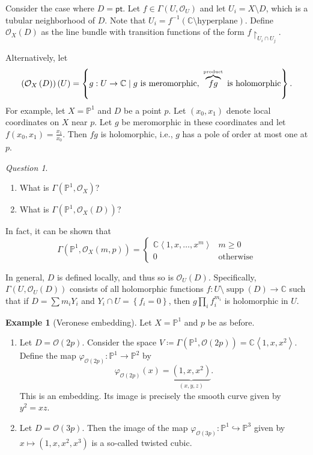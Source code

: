 \documentclass[10pt,letterpaper,cm]{nupset}
\theoremstyle{definition}
\newtheorem{exmp}[defn]{Example}
\theoremstyle{theorem}
\theoremstyle{remark}
\newtheorem*{question}{Question}
\newcommand{\C}{\mathbb C}
\renewcommand{\O}{\mathcal O}
\renewcommand{\P}{\mathbb P}
\newcommand{\1}{\mathbb{1}}
\newcommand{\0}{\vec 0}
\newcommand{\pt}{\mathsf{pt}}
\DeclareMathOperator{\supp}{supp}
\newcommand{\be}{\begin{enumerate}}
\newcommand{\ee}{\end{enumerate}}
\begin{document}
\medskip

Consider the case where $D = \pt$. Let $f \in \Gamma\left(U, \O_U\right)$ and let $U_i = X \setminus D$, which is a tubular neighborhood of $D$. Note that $U_i = f^{-1}\left (\C\setminus\text{hyperplane}\right)$. Define $\O_X(D)$ as the line bundle with transition functions of the form $f \restriction_{U_i \cap U_j}$.

\medskip

Alternatively, let $$\left(\O_X\left(D\right)\right)\left(U\right) = \left\{g : U \to \C  \mid g \text{ is meromorphic}, \ \overbrace{fg}^{\text{\tiny product}} \text{ is holomorphic}\right\}.$$
For example,
let $X = \P^1$ and $D$ be a point $p$. Let $\left(x_0, x_1\right)$ denote local coordinates on $X$ near $p$. Let $g$ be meromorphic in these coordinates and let $f\left(x_0, x_1\right) = \frac{x_1}{x_0}$. Then $f{g}$ is holomorphic, i.e., $g$ has a pole of order at most one at $p$. 
\begin{question} $ $
\be
\item What is $\Gamma\left(\P^1, \O_X\right)$?
\item What is $\Gamma\left(\P^1, \O_X\left(D\right)\right)$?
\ee
\end{question}

In fact, it can be shown that
\[
\Gamma\left(\P^1, \O_X\left(m,p\right)\right) = \begin{cases}
\C\left\langle 1, x, \ldots, x^m\right\rangle & m \geq 0 
\\ 0 & \text{otherwise}
\end{cases}
\]

\bigskip

In general, $D$ is defined locally, and thus so is $\O_U(D)$. Specifically,
$\Gamma\left(U, \O_U\left(D\right)\right)$ consists of all holomorphic functions $f : U \setminus \supp\left(D\right) \to \C$ such that if $D = \sum m_iY_i$ and $Y_i \cap U = \left\{f_i =0\right\}$, then $g\prod_if_i^{m_i}$ is holomorphic in $U$.

\begin{exmp}[Veronese embedding]
Let $X = \P^1$ and $p$ be as before. 
\be
\item Let $D = \O(2p)$. Consider the space $V \coloneqq \Gamma\left(\P^1, \O\left(2p\right)\right) = \C\left\langle 1, x, x^2\right\rangle.$ Define the map $\varphi_{\O(2p)} : \P^1 \to \P^2$ by $$\varphi_{\O(2p)}(x) = \underbrace{\left(1, x, x^2\right)}_{\left(x,y,z\right)}.$$ This is an embedding. Its image is precisely the smooth curve given by $y^2 = xz$.
\item Let $D = \O(3p)$. Then the image of the map $\varphi_{\O(3p)} : \P^1 \hookrightarrow \P^3$ given by $x \mapsto \left(1, x, x^2, x^3\right)$ is a so-called twisted cubic.
\ee
\end{exmp}
\end{document}
